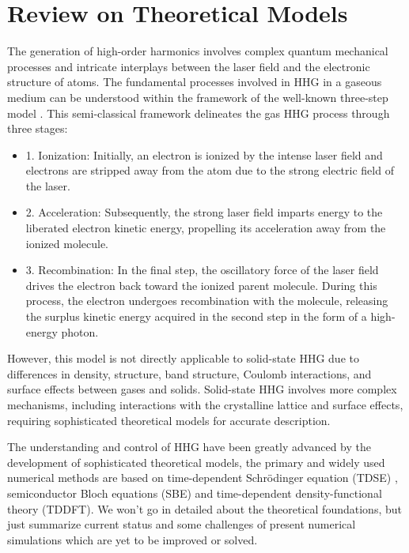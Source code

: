 \section{Review on Theoretical Models}
The generation of high-order harmonics involves complex quantum mechanical processes and intricate
interplays between the laser field and the electronic structure of atoms. The fundamental processes involved in HHG in a gaseous medium can
be understood within the framework of the well-known three-step model  \cite{corkum1993plasma,
	lewenstein1994theory}. This semi-classical framework delineates the gas HHG process through three stages:
\begin{itemize}
	\item 1. Ionization: Initially, an electron is ionized by the intense laser field and electrons are stripped away from the atom due to the strong electric field of the laser.

	\item 2. Acceleration: Subsequently, the strong laser field imparts energy to the liberated electron kinetic energy, propelling its acceleration away from the ionized molecule.

	\item 3. Recombination: In the final step, the oscillatory force of the laser field drives the electron back toward the ionized parent molecule. During this process, the electron undergoes recombination with the molecule, releasing the surplus kinetic energy acquired in the second step in the form of a high-energy photon.\\
\end{itemize}

However, this model is not directly applicable to solid-state HHG due to differences in density, structure, band structure, Coulomb interactions, and surface effects between gases and solids. Solid-state HHG involves more complex mechanisms, including interactions with the crystalline lattice and surface effects, requiring sophisticated theoretical models for accurate description.

The understanding and control of HHG have been greatly advanced by the development of sophisticated
theoretical models, the primary and widely used numerical methods are based on time-dependent
Schrödinger equation (\gls{TDSE}) , semiconductor Bloch equations (\gls{SBE})
and time-dependent density-functional theory (\gls{TDDFT}).
We won't go in detailed about the theoretical foundations, but just summarize current status and some challenges of present numerical simulations which are yet to be improved or solved.

